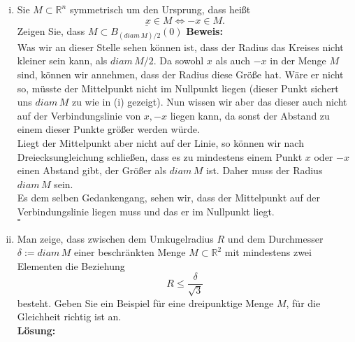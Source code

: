 \documentclass[11pt,a4paper,ngerman]{article}
\begin{document}
\begin{enumerate}[(i)]
		\item Sie $M \subset \mathbb{R}^n$ symmetrisch um den Ursprung, dass heißt
			$$
				x \in M \Longleftrightarrow -x \in M.
			$$
			Zeigen Sie, dass $M \subset \overline{B_{(diam \, M )/ 2}(0)}$
		\textbf{Beweis:}\\
            Was wir an dieser Stelle sehen können ist, dass der Radius das Kreises nicht
            kleiner sein kann, als $diam \, M / 2$. Da sowohl $x$ als auch $-x$ in der Menge
            $M$ sind, können wir annehmen, dass der Radius diese Größe hat. Wäre
            er nicht so, müsste der Mittelpunkt nicht im Nullpunkt liegen (dieser Punkt sichert
            uns $diam \, M$ zu wie in (i) gezeigt). Nun wissen wir aber das dieser auch nicht
            auf der Verbindungslinie von $x, -x$ liegen kann, da sonst der Abstand zu einem
            dieser Punkte größer werden würde.\\
            Liegt der Mittelpunkt aber nicht auf der Linie, so können wir nach Dreiecksungleichung
            schließen, dass es zu mindestens einem Punkt $x$ oder $-x$ einen Abstand gibt,
            der Größer als $diam \, M$ ist. Daher muss der Radius $diam \, M$ sein.\\
            Es dem selben Gedankengang, sehen wir, dass der Mittelpunkt auf der Verbindungslinie
            liegen muss und das er im Nullpunkt liegt.\\

            \mbox{} \hfill $\square$

		\item Man zeige, dass zwischen dem Umkugelradius $R$ und dem Durchmesser $\delta := diam \, M$ einer beschränkten Menge
		 $M \subset \mathbb{R}^2$ mit mindestens zwei Elementen die Beziehung
			$$
				R \leq \frac{\delta}{\sqrt{3}}
			$$
		besteht. Geben Sie ein Beispiel für eine dreipunktige Menge $M$, für die Gleichheit richtig ist an.\\
		\textbf{Lösung:}\\
			
	\end{enumerate}

\label{LastPage}
\end{document}
